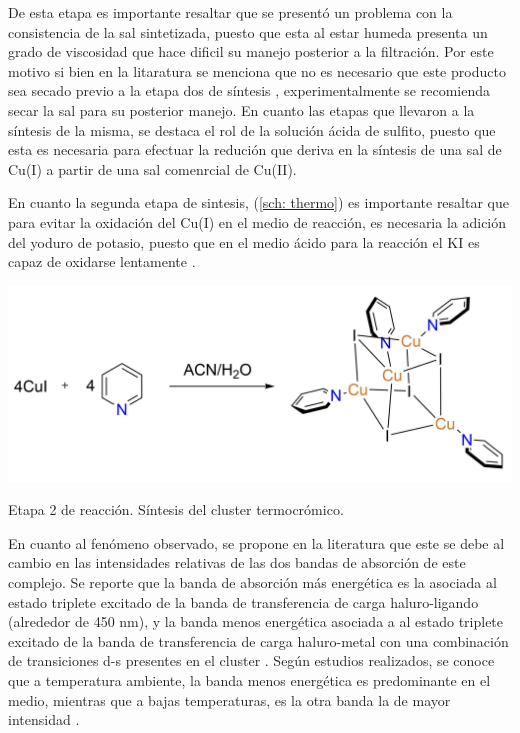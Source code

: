 \documentclass[fleqn,10pt]{SelfArx}
\begin{document}
De esta etapa es importante resaltar que se presentó un problema con la consistencia de la sal sintetizada, puesto que esta al estar humeda presenta un grado de viscosidad que hace dificil su manejo posterior a la filtración. Por este motivo si bien en la litaratura se menciona que no es necesario que este producto sea secado previo a la etapa dos de síntesis \cite{parmeggiani_sacchetti_2012}, experimentalmente se recomienda secar la sal para su posterior manejo. En cuanto las etapas que llevaron a la síntesis de la misma,  se destaca el rol de la solución ácida de sulfito, puesto que esta es necesaria para efectuar la redución que deriva en la síntesis de una sal de Cu(I) a partir de una sal comenrcial de Cu(II). 

En cuanto la segunda etapa de sintesis, (\autoref{sch: thermo}) es importante resaltar que para evitar la oxidación del Cu(I) en el medio de reacción, es necesaria la adición del yoduro de potasio, puesto que en el medio ácido para la reacción el KI es capaz de oxidarse lentamente \cite{delury_1902}.
\begin{scheme}[h]
	\centering
	\includegraphics[width=0.8\linewidth]{Structures/thermo_scheme.JPG}
	\caption{Etapa 2 de reacción. Síntesis del cluster termocrómico.}
	\label{sch: thermo}
\end{scheme}

En cuanto al fenómeno observado, se propone en la literatura que este se debe al cambio en las  intensidades relativas de las dos bandas de absorción de este complejo. Se reporte que la banda de absorción más energética es la asociada al estado triplete excitado de la banda de transferencia de carga haluro-ligando (alrededor de 450 nm), y la banda menos energética asociada a al estado triplete excitado de la banda de transferencia de carga haluro-metal con una combinación de transiciones d-s presentes en el cluster \cite{parmeggiani_sacchetti_2012}. Según estudios realizados, se conoce que a temperatura ambiente, la banda menos energética es predominante en el medio, mientras que a bajas temperaturas, es la otra banda la de mayor intensidad \cite{yang_li_zhang_zhang_2016}\cite{parmeggiani_sacchetti_2012}\cite{kitagawa_ozawa_toriumi_2010}.
\end{document}
